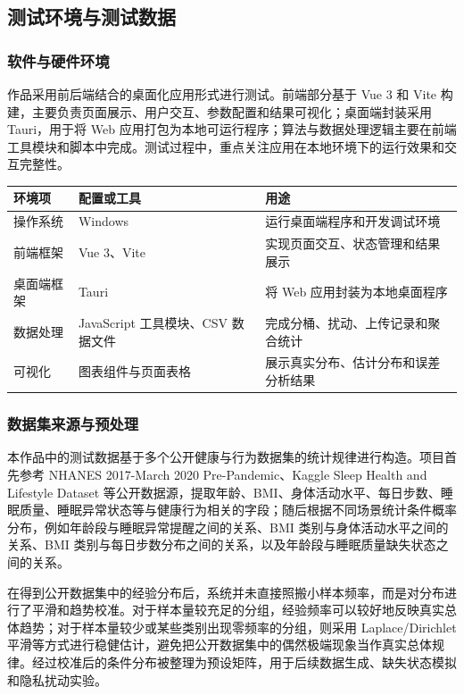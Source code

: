 \documentclass{cumcmthesis}
\numberwithin{equation}{section}
\numberwithin{figure}{section}
\numberwithin{table}{section}
\begin{document}
\subsection{测试环境与测试数据}

\subsubsection{软件与硬件环境}

作品采用前后端结合的桌面化应用形式进行测试。前端部分基于 Vue 3 和 Vite 构建，主要负责页面展示、用户交互、参数配置和结果可视化；桌面端封装采用 Tauri，用于将 Web 应用打包为本地可运行程序；算法与数据处理逻辑主要在前端工具模块和脚本中完成。测试过程中，重点关注应用在本地环境下的运行效果和交互完整性。

\begin{table}[htbp]
\centering
\small
\begin{tabularx}{\textwidth}{|>{\raggedright\arraybackslash}X|>{\raggedright\arraybackslash}X|>{\raggedright\arraybackslash}X|}
\hline
环境项 & 配置或工具 & 用途 \\ \hline
操作系统 & Windows & 运行桌面端程序和开发调试环境 \\ \hline
前端框架 & Vue 3、Vite & 实现页面交互、状态管理和结果展示 \\ \hline
桌面端框架 & Tauri & 将 Web 应用封装为本地桌面程序 \\ \hline
数据处理 & JavaScript 工具模块、CSV 数据文件 & 完成分桶、扰动、上传记录和聚合统计 \\ \hline
可视化 & 图表组件与页面表格 & 展示真实分布、估计分布和误差分析结果 \\ \hline
\end{tabularx}
\end{table}

\subsubsection{数据集来源与预处理}

本作品中的测试数据基于多个公开健康与行为数据集的统计规律进行构造。项目首先参考 NHANES 2017-March 2020 Pre-Pandemic、Kaggle Sleep Health and Lifestyle Dataset 等公开数据源，提取年龄、BMI、身体活动水平、每日步数、睡眠质量、睡眠异常状态等与健康行为相关的字段；随后根据不同场景统计条件概率分布，例如年龄段与睡眠异常提醒之间的关系、BMI 类别与身体活动水平之间的关系、BMI 类别与每日步数分布之间的关系，以及年龄段与睡眠质量缺失状态之间的关系。

在得到公开数据集中的经验分布后，系统并未直接照搬小样本频率，而是对分布进行了平滑和趋势校准。对于样本量较充足的分组，经验频率可以较好地反映真实总体趋势；对于样本量较少或某些类别出现零频率的分组，则采用 Laplace/Dirichlet 平滑等方式进行稳健估计，避免把公开数据集中的偶然极端现象当作真实总体规律。经过校准后的条件分布被整理为预设矩阵，用于后续数据生成、缺失状态模拟和隐私扰动实验。
\end{document}
